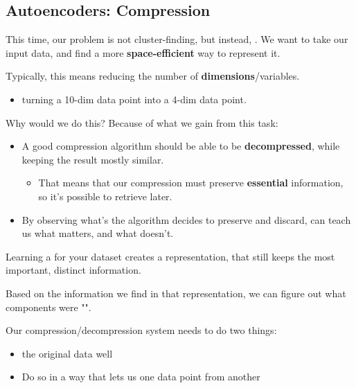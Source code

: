     \subsection{Autoencoders: Compression}

        This time, our problem is not cluster-finding, but instead, . We want to take our input data, and find a more \textbf{space-efficient} way to represent it.

        Typically, this means reducing the number of \textbf{dimensions}/variables. 

        \begin{itemize}
            \item \miniex turning a 10-dim data point into a 4-dim data point.
        \end{itemize}

        Why would we do this? Because of what we gain from this task:

        \begin{itemize}
            \item A good compression algorithm should be able to be \textbf{decompressed}, while keeping the result mostly similar.
                \begin{itemize}
                    \item That means that our compression must preserve \textbf{essential} information, so it's possible to retrieve later.
                \end{itemize}

            \item By observing what's the algorithm decides to preserve and discard, can teach us what matters, and what doesn't.\\
        \end{itemize}

        \begin{concept}
            Learning a  for your dataset creates a  representation, that still keeps the most important, distinct information.

            Based on the information we find in that representation, we can figure out what components were "".
        \end{concept}
        
        Our compression/decompression system needs to do two things:

        \begin{itemize}
            \item {} the original data well
            \item Do so in a way that lets us  one data point from another
        \end{itemize}


